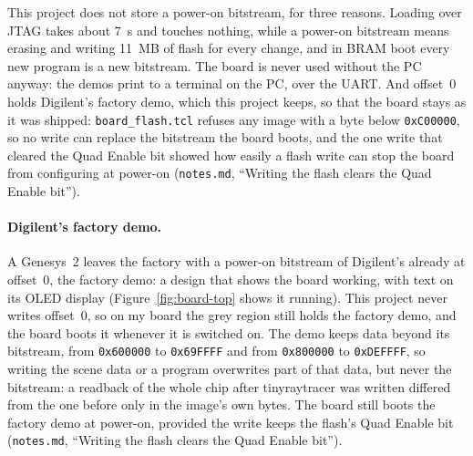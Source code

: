 \documentclass[11pt,a4paper]{report}
\newcommand{\notes}[1]{(\texttt{notes.md}, ``#1'')}
\begin{document}
This project does not store a power-on bitstream, for three reasons. Loading over JTAG takes about 7~s and
touches nothing, while a power-on bitstream means erasing and writing 11~MB of flash for every
change, and in BRAM boot every new program is a new bitstream. The board is never used without
the PC anyway: the demos print to a terminal on the PC, over the UART. And offset~0 holds
Digilent's factory demo, which this project keeps, so that the board stays as it was shipped:
\texttt{board\_flash.tcl} refuses any image with a byte below \texttt{0xC00000}, so no write
can replace the bitstream the board boots, and the one write that cleared the Quad Enable bit
showed how easily a flash write can stop the board from configuring at power-on \notes{Writing
the flash clears the Quad Enable bit}.

\paragraph{Digilent's factory demo.} A Genesys~2 leaves the factory with a power-on bitstream
of Digilent's already at offset~0, the factory demo: a design that shows the board working,
with text on its OLED display (Figure~\ref{fig:board-top} shows it running). This project
never writes offset~0, so on my board the grey region still holds the factory demo,
and the board boots it whenever it is switched on. The demo keeps data beyond its bitstream,
from \texttt{0x600000} to \texttt{0x69FFFF} and from \texttt{0x800000} to \texttt{0xDEFFFF},
so writing the scene data or a program overwrites part of that data, but never the
bitstream: a readback of the whole chip after tinyraytracer was written differed from the
one before only in the image's own bytes. The board still boots the factory demo at power-on,
provided the write keeps the flash's Quad Enable bit \notes{Writing the flash clears the Quad
Enable bit}.
\end{document}

